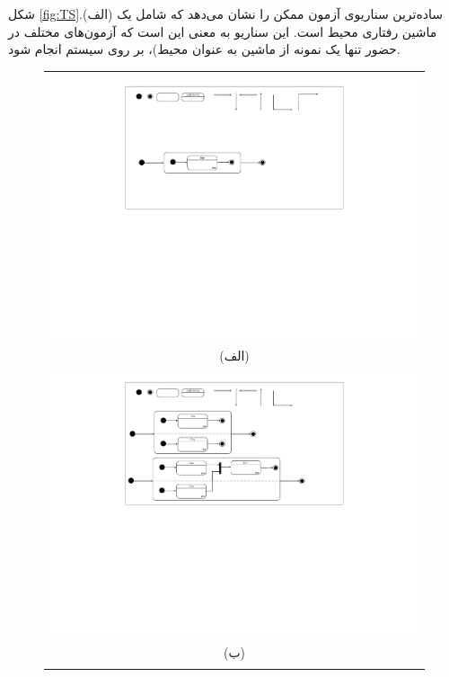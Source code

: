 شکل \ref{fig:TS}.(الف) ساده‌ترین سناریو‌ی آزمون ممکن را نشان می‌دهد که شامل یک ماشین رفتاری محیط است. این سناریو به معنی این است که آزمون‌های مختلف در حضور تنها یک نمونه از ماشین  به عنوان محیط)، بر روی سیستم انجام شود. 
\begin{figure}
    \begin{center}
    \begin{tabular}{| c |}
   	\hline
	\\
	 \includegraphics[width=12cm]{4-ProposedFramework/Figures/TS-1.pdf}
	\\
	(الف)
	\\
	\hline
	\\
	\includegraphics[width=12cm]{4-ProposedFramework/Figures/TS-2.pdf}
	\\
	(ب)
	\\
	\hline
	\\

\end{tabular}
\end{center}
\end{figure}
